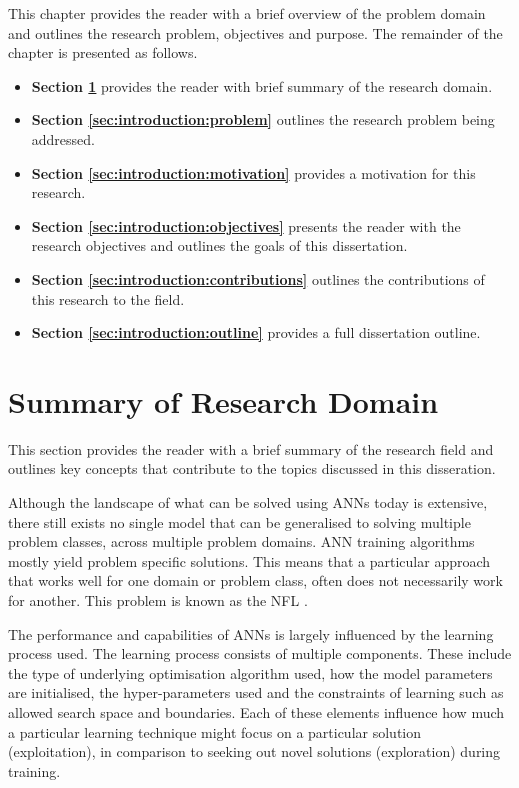 This chapter provides the reader with a brief overview of the problem domain and outlines the research problem, objectives and purpose. The remainder of the chapter is presented as follows.

\begin{itemize}
      \item \textbf{Section \ref{sec:introduction:summary_research_domain}} provides the reader with brief summary of the research domain.

      \item \textbf{Section \ref{sec:introduction:problem}} outlines the research problem being addressed.

      \item \textbf{Section \ref{sec:introduction:motivation}} provides a motivation for this research.

      \item \textbf{Section \ref{sec:introduction:objectives}} presents the reader with the research objectives and outlines the goals of this dissertation.

      \item \textbf{Section \ref{sec:introduction:contributions}} outlines the contributions of this research to the field.

      \item \textbf{Section \ref{sec:introduction:outline}} provides a full dissertation outline.
\end{itemize}


\section{Summary of Research Domain}\label{sec:introduction:summary_research_domain}

This section provides the reader with a brief summary of the research field and outlines key concepts that contribute to the topics discussed in this disseration.

Although the landscape of what can be solved using \acp{ANN} today is extensive, there still exists no single model that can be generalised to solving multiple problem classes, across multiple problem domains. \acs{ANN} training algorithms mostly yield problem specific solutions. This means that a particular approach that works well for one domain or problem class, often does not necessarily work for another. This problem is known as the \ac{NFL} \cite{ref:wolpert:1997}.

The performance and capabilities of \acp{ANN} is largely influenced by the learning process used. The learning process consists of multiple components. These include the type of underlying optimisation algorithm used, how the model parameters are initialised, the hyper-parameters used and the constraints of learning such as allowed search space and boundaries. Each of these elements influence how much a particular learning technique might focus on a particular solution (exploitation), in comparison to seeking out novel solutions (exploration) during training.

